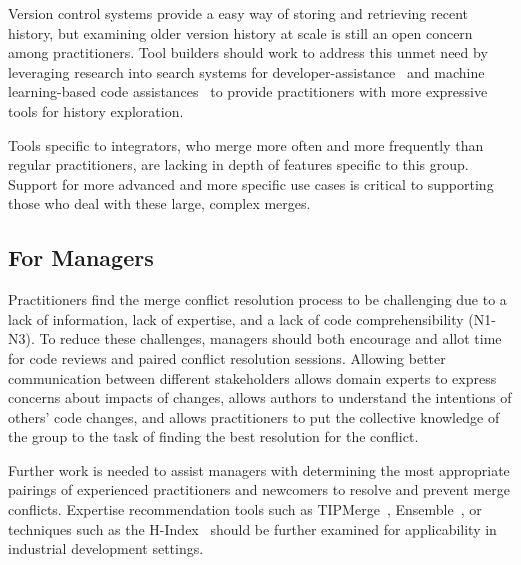 Version control systems provide a easy way of storing and retrieving recent history, but examining older version history at scale is still an open concern among practitioners.
Tool builders should work to address this unmet need by leveraging research into search systems for developer-assistance~\cite{nabi2016putting} and machine learning-based code assistances~\cite{bradley2011history_exploration} to provide practitioners with more expressive tools for history exploration.

Tools specific to integrators, who merge more often and more frequently than regular practitioners, are lacking in depth of features specific to this group.
Support for more advanced and more specific use cases is critical to supporting those who deal with these large, complex merges. 

\subsection{For Managers}
Practitioners find the merge conflict resolution process to be challenging due to a lack of information, lack of expertise, and a lack of code comprehensibility (N1-N3). 
To reduce these challenges, managers should both encourage and allot time for code reviews and paired conflict resolution sessions. 
Allowing better communication between different stakeholders allows domain experts to express concerns about impacts of changes, allows authors to understand the intentions of others' code changes, and allows practitioners to put the collective knowledge of the group to the task of finding the best resolution for the conflict.

Further work is needed to assist managers with determining the most appropriate pairings of experienced practitioners and newcomers to resolve and prevent merge conflicts.
Expertise recommendation tools such as TIPMerge~\cite{CostaSarma}, Ensemble~\cite{xiang2008ensemble}, or techniques such as the H-Index~\cite{bornmann2005does} should be further examined for applicability in industrial development settings.